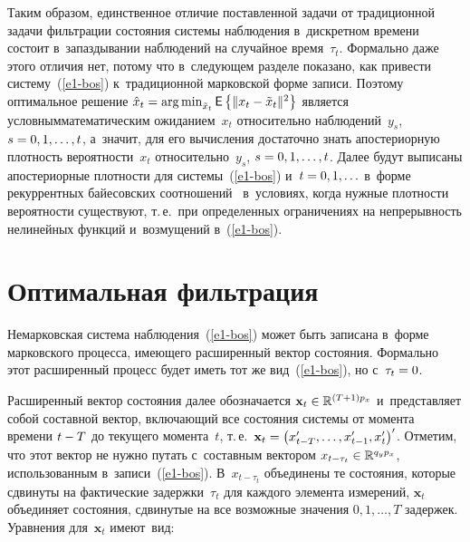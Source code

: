 \begin{multicols}{2}
     Таким образом, единственное отличие по\-став\-лен\-ной задачи от 
традиционной задачи фильт\-ра\-ции со\-сто\-яния сис\-те\-мы наблюдения 
в~дискретном времени со\-сто\-ит в~запаздывании наблюдений на случайное 
время~$\tau_t$. Формально даже этого отличия нет, потому что в~сле\-ду\-ющем 
разделе показано, как при\-вес\-ти сис\-те\-му~(\ref{e1-bos}) к~традиционной 
марковской фор\-ме записи. Поэтому оптимальное решение $\hat{x}_t\hm= 
\argmin_{\tilde{x}_t} {\sf E} \left\{ \| x_t\hm- \tilde{x}_t\|^2\right\}$ является 
условным\linebreak математическим ожиданием~$x_t$ относительно 
наблюдений~$y_s$, $s\hm=0,1,\ldots , t$, а~значит, для его вы\-чис\-ле\-ния 
достаточно знать апостериорную плот\-ность ве\-ро\-ят\-ности~$x_t$ 
относительно~$y_s$, $s\hm= 0,1,\ldots , t$. Далее будут выписаны 
апостериорные плотности для сис\-те\-мы~(\ref{e1-bos}) и~$t\hm= 0,1,\ldots$ 
в~форме рекуррентных байесовских соотношений~\cite{21-bos} в~условиях, 
когда нуж\-ные плотности ве\-ро\-ят\-ности существуют, т.\,е.\ при определенных 
ограничениях на не\-пре\-рыв\-ность нелинейных функций и~возмущений 
в~(\ref{e1-bos}).
     
\section{Оптимальная фильтрация}

     Немарковская система наблюдения~(\ref{e1-bos}) может быть записана 
в~форме марковского процесса, име\-юще\-го расширенный век\-тор со\-сто\-яния. 
Формально этот расширенный процесс будет иметь тот же вид~(\ref{e1-bos}), 
но с~$\tau_t\hm=0$.
     
     Расширенный вектор со\-сто\-яния далее обозначается $\mathbf{x}_t 
\hm\in \mathbb{R}^{(T+1)p_x}$ и~пред\-став\-ля\-ет собой со\-став\-ной век\-тор, 
вклю\-ча\-ющий все со\-сто\-яния сис\-те\-мы от момента времени $t\hm- T$ до 
текущего момента~$t$, т.\,е.\ $\mathbf{x}_t \hm= \left( x^\prime_{t-T}, \ldots , 
x^\prime_{t-1}, x_t^\prime\right)^\prime$.  Отметим, что этот век\-тор 
не нуж\-но путать с~со\-став\-ным вектором $x_{t-\tau_t} \hm\in \mathbb{R}^{q_y 
p_x}$, использованным в~записи~(\ref{e1-bos}). В~$x_{t-\tau_t}$ объединены 
те со\-сто\-яния, которые сдвинуты на фактические за\-держ\-ки~$\tau_t$ для 
каж\-до\-го элемента измерений, $\mathbf{x}_t$ объединяет со\-сто\-яния, 
сдвинутые на все воз\-мож\-ные значения $0,1,\ldots , T$ за\-дер\-жек.  Урав\-не\-ния 
для~$\mathbf{x}_t$ име\-ют~вид:


\end{multicols}
